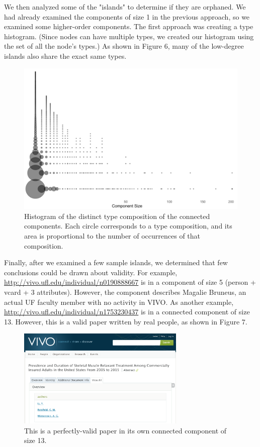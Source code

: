 \documentclass[11pt]{article}
\begin{document}
We then analyzed some of the "islands" to determine if they are orphaned. We had already examined the components of size 1 in the previous approach, so we examined some higher-order components. The first approach was creating a type histogram. (Since nodes can have multiple types, we created our histogram using the set of all the node's types.) As shown in Figure 6, many of the low-degree islands also share the exact same types.

\begin{figure}[h!]
\centering
\includegraphics[width=\textwidth]{type-histogram.png}
\caption{Histogram of the distinct type composition of the connected components. Each circle corresponds to a type composition, and its area is proportional to the number of occurrences of that composition.}
\label{fig:output}
\end{figure}

\pagebreak

Finally, after we examined a few sample islands, we determined that few conclusions could be drawn about validity. For example, \url{http://vivo.ufl.edu/individual/n0190888667} is in a component of size 5 (person + vcard + 3 attributes). However, the component describes Magalie Bruneus, an actual UF faculty member with no activity in VIVO. As another example, \url{http://vivo.ufl.edu/individual/n1753230437} is in a connected component of size 13. However, this is a valid paper written by real people, as shown in Figure 7.

\begin{figure}[h!]
\centering
\includegraphics[width=8cm]{valid-paper.png}
\caption{This is a perfectly-valid paper in its own connected component of size 13.}
\label{fig:output}
\end{figure}
\end{document}
